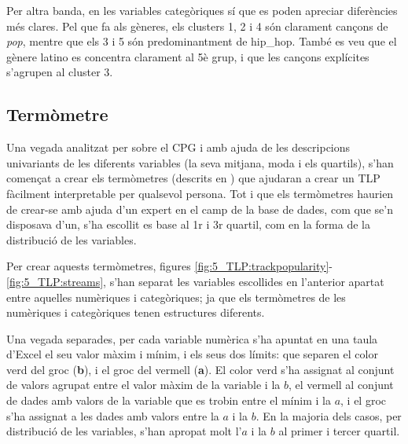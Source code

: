 Per altra banda, en les variables categòriques sí que es poden apreciar diferències més clares. Pel que fa als gèneres, els clusters 1, 2 i 4 són clarament cançons de \textit{pop}, mentre que els 3 i 5 són predominantment de hip\_hop. També es veu que el gènere latino es concentra clarament al 5è grup, i que les cançons explícites s'agrupen al cluster 3.
 
\subsection{Termòmetre}

Una vegada analitzat per sobre el CPG i amb ajuda de les descripcions univariants de les diferents variables (la seva mitjana, moda i els quartils), s'han començat a crear els termòmetres (descrits en \cite{angerri_2023_variable}) que ajudaran a crear un TLP fàcilment interpretable per qualsevol persona. Tot i que els termòmetres haurien de crear-se amb ajuda d'un expert en el camp de la base de dades, com que se'n disposava d'un, s'ha escollit es base al 1r i 3r quartil, com en la forma de la distribució de les variables.

Per crear aquests termòmetres, figures \ref{fig:5_TLP:trackpopularity}-\ref{fig:5_TLP:streams}, s'han separat les variables escollides en l'anterior apartat entre aquelles numèriques i categòriques; ja que els termòmetres de les numèriques i categòriques tenen estructures diferents.

Una vegada separades, per cada variable numèrica s'ha apuntat en una taula d'Excel el seu valor màxim i mínim, i els seus dos límits: que separen el color verd del groc (\textbf{b}), i el groc del vermell (\textbf{a}). El color verd s'ha assignat al conjunt de valors agrupat entre el valor màxim de la variable i la $b$, el vermell al conjunt de dades amb valors de la variable que es trobin entre el mínim i la $a$, i el groc s'ha assignat a les dades amb valors entre la $a$ i la $b$. En la majoria dels casos, per distribució de les variables, s'han apropat molt l'$a$ i la $b$ al primer i tercer quartil.

